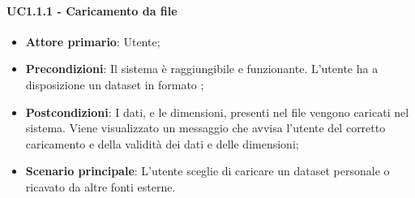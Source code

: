\paragraph{UC1.1.1 - Caricamento da file}
\begin{itemize}
	\item \textbf{Attore primario}: Utente;
	\item \textbf{Precondizioni}: Il sistema è raggiungibile e funzionante. L'utente ha a disposizione un dataset in formato ;
	\item \textbf{Postcondizioni}: I dati, e le dimensioni, presenti nel file vengono caricati nel sistema. Viene visualizzato un messaggio che avvisa l'utente del corretto caricamento e della validità dei dati e delle dimensioni;
	\item \textbf{Scenario principale}: L'utente sceglie di caricare un dataset personale o ricavato da altre fonti esterne.
	
\end{itemize}